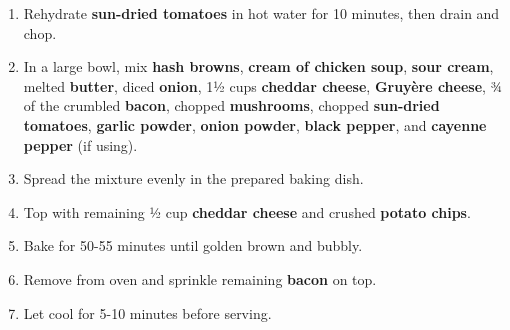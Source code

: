 \documentclass[11pt,letterpaper]{article}
\begin{document}
\begin{enumerate}
    \item Rehydrate \textbf{sun-dried tomatoes} in hot water for 10 minutes, then drain and chop.
    \item In a large bowl, mix \textbf{hash browns}, \textbf{cream of chicken soup}, \textbf{sour cream}, melted \textbf{butter}, diced \textbf{onion}, 1½ cups \textbf{cheddar cheese}, \textbf{Gruyère cheese}, ¾ of the crumbled \textbf{bacon}, chopped \textbf{mushrooms}, chopped \textbf{sun-dried tomatoes}, \textbf{garlic powder}, \textbf{onion powder}, \textbf{black pepper}, and \textbf{cayenne pepper} (if using).
    \item Spread the mixture evenly in the prepared baking dish.
    \item Top with remaining ½ cup \textbf{cheddar cheese} and crushed \textbf{potato chips}.
    \item Bake for 50-55 minutes until golden brown and bubbly.
    \item Remove from oven and sprinkle remaining \textbf{bacon} on top.
    \item Let cool for 5-10 minutes before serving.
\end{enumerate}
\end{document}
